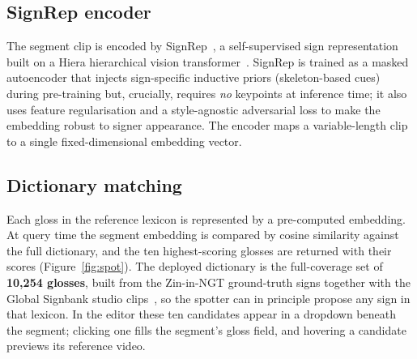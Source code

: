 \documentclass[11pt]{article}
\begin{document}
\subsection{SignRep encoder}
The segment clip is encoded by SignRep~\citep{signrep}, a self-supervised sign representation built
on a Hiera hierarchical vision transformer~\citep{hiera}. SignRep is trained as a masked autoencoder
that injects sign-specific inductive priors (skeleton-based cues) during pre-training but, crucially,
requires \emph{no} keypoints at inference time; it also uses feature regularisation and a
style-agnostic adversarial loss to make the embedding robust to signer appearance. The encoder maps a
variable-length clip to a single fixed-dimensional embedding vector.

\subsection{Dictionary matching}
Each gloss in the reference lexicon is represented by a pre-computed embedding. At query time the
segment embedding is compared by cosine similarity against the full dictionary, and the ten
highest-scoring glosses are returned with their scores (Figure~\ref{fig:spot}). The deployed
dictionary is the full-coverage set of \textbf{10{,}254 glosses}, built from the Zin-in-NGT
ground-truth signs together with the Global Signbank studio clips~\citep{signbank}, so the spotter
can in principle propose any sign in that lexicon. In the editor these ten candidates appear in a
dropdown beneath the segment; clicking one fills the segment's gloss field, and hovering a candidate
previews its reference video.
\end{document}
